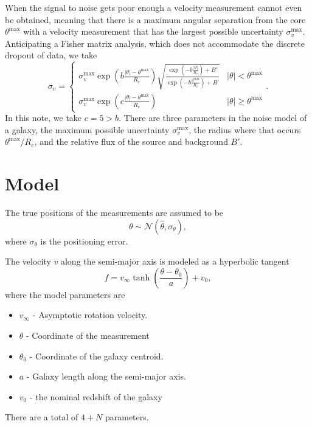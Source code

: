 \documentclass[11pt, oneside]{article}   	%
\begin{document}
When the signal to noise gets poor enough a velocity measurement cannot even be obtained, meaning that there 
is a maximum angular separation from the core $\theta^{\text{max}}$  with a velocity  measurement
that has the largest possible uncertainty $ \sigma_v^\text{max}$.  Anticipating a Fisher matrix analysis, which does not accommodate the
discrete dropout of data, we take
\begin{equation}
\sigma_v = 
	\begin{cases}
	 \sigma_v^\text{max} \exp{\left(b \frac{|\theta|-\theta^\text{max}}{R_e}\right)} \sqrt{\frac{\exp{\left(-b \frac{|\theta|}{R_e}\right)}+ B'}{\exp{\left(-b \frac{\theta^\text{max}}{R_e}\right)}+B'}} & |{\theta}| < \theta^{\text{max}}\\
	 \sigma_v^\text{max} \exp{\left(c \frac{|\theta|-\theta^\text{max}}{R_e}\right)} &  |{\theta}| \ge \theta^{\text{max}} 
	 \end{cases}.
\end{equation}
In this note, we take $c=5>b$.
There are three parameters in the noise model of a galaxy, the maximum possible uncertainty
$\sigma_v^\text{max}$, the radius where that occurs $\theta^\text{max}/R_e$, and the relative flux
of the source and background $B'$.


\section{Model}
The true positions of the measurements are assumed to be
\begin{equation}
\theta \sim \mathcal{N}(\hat{\theta},\sigma_\theta),
\end{equation}
where $\sigma_\theta$ is the positioning error.

The velocity $v$ along the semi-major axis is modeled as a hyperbolic tangent
\begin{equation}
f=v_\infty \tanh{\left(\frac{\theta - \theta_0}{a}\right)} + v_0,
\end{equation}
where the model parameters are
\begin{itemize}
\item $v_\infty$ - Asymptotic rotation velocity.
\item $\theta$ - Coordinate of the measurement
\item $\theta_0$ - Coordinate of the galaxy centroid. 
\item $a$ - Galaxy length along the semi-major axis.
\item $v_0$ - the nominal redshift of the galaxy
\end{itemize}
There are a total of $4+N$ parameters.
\end{document}
